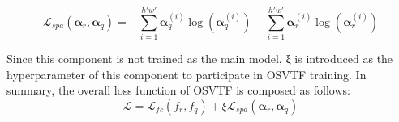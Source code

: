 \begin{equation}
\label{eq19}
  \mathcal{L}_{spa} (\boldsymbol{\alpha}_r,\boldsymbol{\alpha}_q ) = -\sum_{i=1}^{h'w'} \boldsymbol{\alpha}_q^{(i)}  \log⁡(\boldsymbol{\alpha}_q^{(i)}) 
  - \sum_{i=1}^{h'w'}\boldsymbol{\alpha}_r^{(i)}  \log⁡(\boldsymbol{\alpha}_r^{(i)})
\end{equation}

Since this component is not trained as the main model, ξ is introduced as the hyperparameter of this component to participate in OSVTF training. In summary, the overall loss function of OSVTF is composed as follows:
\begin{equation}
\label{eq20}
  \mathcal{L} = \mathcal{L}_{fc} (f_r,f_q) + \xi\mathcal{L}_{spa} (\boldsymbol{\alpha}_r,\boldsymbol{\alpha}_q)
\end{equation}

















